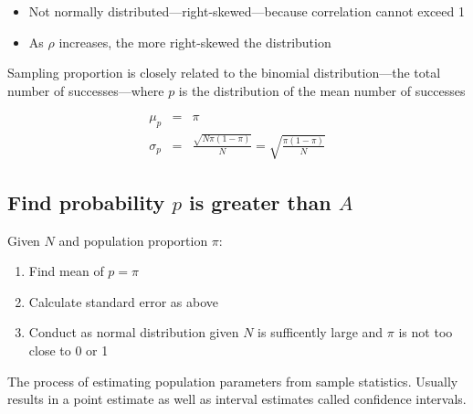 \hformbar




\begin{itemize}
  \item Not normally distributed---right-skewed---because correlation cannot
	exceed 1
  \item As $\rho$ increases, the more right-skewed the distribution
\end{itemize}

\hformbar




Sampling proportion is closely related to the binomial distribution---the
total number of successes---where $p$ is the distribution of the mean number of
successes

\begin{eqnarray}
  \mu_p &=& \pi \\
  \sigma_p &=& \frac{\sqrt{N \pi (1 - \pi)}}{N}
           = \sqrt{\frac{\pi (1 - \pi)}{N}}
\end{eqnarray}

\subsection*{Find probability $p$ is greater than $A$}

Given $N$ and population proportion $\pi$:

\begin{enumerate}
  \item Find mean of $p = \pi$
  \item Calculate standard error as above
  \item Conduct as normal distribution given $N$ is sufficently large and $\pi$
	is not too close to 0 or 1
\end{enumerate}

\hformbar




The process of estimating population parameters from sample statistics. Usually
results in a point estimate as well as interval estimates called confidence
intervals.

\hformbar






